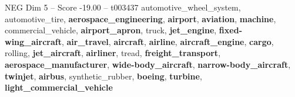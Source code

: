 \begin{textsample}{NEG Dim 5 – Score -19.00 – t003437}  \label{ex:f5_neg_015}
automotive\_wheel\_system, automotive\_tire, \textbf{aerospace\_engineering}, \textbf{airport}, \textbf{aviation}, \textbf{machine}, commercial\_vehicle, \textbf{airport\_apron}, truck, \textbf{jet\_engine}, \textbf{fixed-wing\_aircraft}, \textbf{air\_travel}, \textbf{aircraft}, \textbf{airline}, \textbf{aircraft\_engine}, \textbf{cargo}, rolling, \textbf{jet\_aircraft}, \textbf{airliner}, tread, \textbf{freight\_transport}, \textbf{aerospace\_manufacturer}, \textbf{wide-body\_aircraft}, \textbf{narrow-body\_aircraft}, \textbf{twinjet}, \textbf{airbus}, synthetic\_rubber, \textbf{boeing}, \textbf{turbine}, \textbf{light\_commercial\_vehicle}

\end{textsample}
